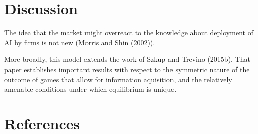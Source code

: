 \documentclass[
]{article}
\theoremstyle{plain}
\theoremstyle{remark}
\begin{document}
\section{Discussion}\label{discussion}

The idea that the market might overreact to the knowledge about
deployment of AI by firms is not new (Morris and Shin (2002)).

More broadly, this model extends the work of Szkup and Trevino (2015b).
That paper establishes important results with respect to the symmetric
nature of the outcome of games that allow for information aquisition,
and the relatively amenable conditions under which equilibrium is
unique.

\section*{References}\label{references}
\end{document}
